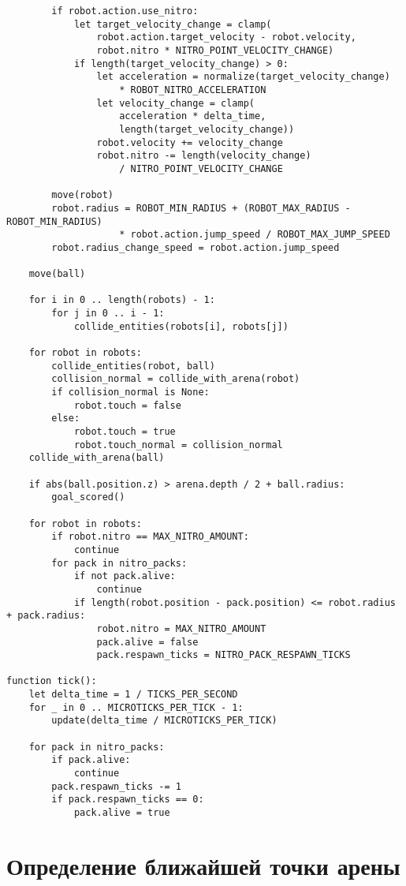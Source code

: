 \begin{verbatim}
        if robot.action.use_nitro:
            let target_velocity_change = clamp(
                robot.action.target_velocity - robot.velocity,
                robot.nitro * NITRO_POINT_VELOCITY_CHANGE)
            if length(target_velocity_change) > 0:
                let acceleration = normalize(target_velocity_change)
                    * ROBOT_NITRO_ACCELERATION
                let velocity_change = clamp(
                    acceleration * delta_time,
                    length(target_velocity_change))
                robot.velocity += velocity_change
                robot.nitro -= length(velocity_change)
                    / NITRO_POINT_VELOCITY_CHANGE

        move(robot)
        robot.radius = ROBOT_MIN_RADIUS + (ROBOT_MAX_RADIUS - ROBOT_MIN_RADIUS)
                    * robot.action.jump_speed / ROBOT_MAX_JUMP_SPEED
        robot.radius_change_speed = robot.action.jump_speed

    move(ball)

    for i in 0 .. length(robots) - 1:
        for j in 0 .. i - 1:
            collide_entities(robots[i], robots[j])

    for robot in robots:
        collide_entities(robot, ball)
        collision_normal = collide_with_arena(robot)
        if collision_normal is None:
            robot.touch = false
        else:
            robot.touch = true
            robot.touch_normal = collision_normal
    collide_with_arena(ball)

    if abs(ball.position.z) > arena.depth / 2 + ball.radius:
        goal_scored()

    for robot in robots:
        if robot.nitro == MAX_NITRO_AMOUNT:
            continue
        for pack in nitro_packs:
            if not pack.alive:
                continue
            if length(robot.position - pack.position) <= robot.radius + pack.radius:
                robot.nitro = MAX_NITRO_AMOUNT
                pack.alive = false
                pack.respawn_ticks = NITRO_PACK_RESPAWN_TICKS

function tick():
    let delta_time = 1 / TICKS_PER_SECOND
    for _ in 0 .. MICROTICKS_PER_TICK - 1:
        update(delta_time / MICROTICKS_PER_TICK)

    for pack in nitro_packs:
        if pack.alive:
            continue
        pack.respawn_ticks -= 1
        if pack.respawn_ticks == 0:
            pack.alive = true
\end{verbatim}

\section{Определение ближайшей точки арены}

